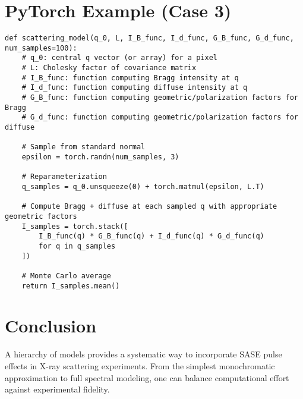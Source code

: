 \documentclass[12pt,a4paper]{article}
\begin{document}
\section{PyTorch Example (Case 3)}
\begin{verbatim}
def scattering_model(q_0, L, I_B_func, I_d_func, G_B_func, G_d_func, num_samples=100):
    # q_0: central q vector (or array) for a pixel
    # L: Cholesky factor of covariance matrix
    # I_B_func: function computing Bragg intensity at q
    # I_d_func: function computing diffuse intensity at q
    # G_B_func: function computing geometric/polarization factors for Bragg
    # G_d_func: function computing geometric/polarization factors for diffuse
    
    # Sample from standard normal
    epsilon = torch.randn(num_samples, 3)
    
    # Reparameterization
    q_samples = q_0.unsqueeze(0) + torch.matmul(epsilon, L.T)
    
    # Compute Bragg + diffuse at each sampled q with appropriate geometric factors
    I_samples = torch.stack([
        I_B_func(q) * G_B_func(q) + I_d_func(q) * G_d_func(q) 
        for q in q_samples
    ])
    
    # Monte Carlo average
    return I_samples.mean()
\end{verbatim}

\section{Conclusion}
A hierarchy of models provides a systematic way to incorporate SASE pulse effects in X-ray scattering experiments. From the simplest monochromatic approximation to full spectral modeling, one can balance computational effort against experimental fidelity. 
\end{document}
